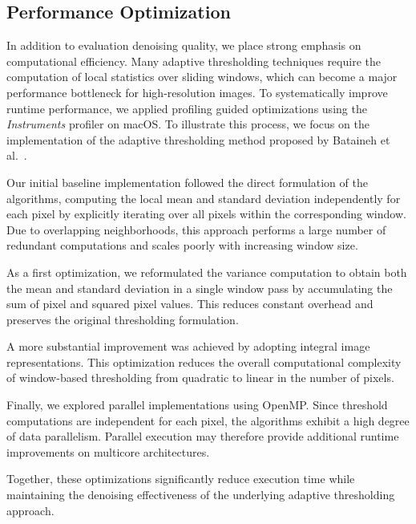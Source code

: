 \subsection{Performance Optimization}\label{subsec:optimizations}

In addition to evaluation denoising quality, we place strong emphasis on computational efficiency.
Many adaptive thresholding techniques require the computation of local statistics over sliding windows, which can become a major performance bottleneck for high-resolution images.
To systematically improve runtime performance, we applied profiling guided optimizations using the \textit{Instruments} profiler on macOS.
To illustrate this process, we focus on the implementation of the adaptive thresholding method proposed by Bataineh et al.~\cite{Bataineh2011}.

Our initial baseline implementation followed the direct formulation of the algorithms, computing the local mean and standard deviation independently for each pixel by explicitly iterating over all pixels within the corresponding window.
Due to overlapping neighborhoods, this approach performs a large number of redundant computations and scales poorly with increasing window size.

As a first optimization, we reformulated the variance computation to obtain both the mean and standard deviation in a single window pass by accumulating the sum of pixel and squared pixel values.
This reduces constant overhead and preserves the original thresholding formulation. 

A more substantial improvement was achieved by adopting integral image representations. 
This optimization reduces the overall computational complexity of window-based thresholding from quadratic to linear in the number of pixels.

Finally, we explored parallel implementations using OpenMP.
Since threshold computations are independent for each pixel, the algorithms exhibit a high degree of data parallelism.
Parallel execution may therefore provide additional runtime improvements on multicore architectures.

Together, these optimizations significantly reduce execution time while maintaining the denoising effectiveness of the underlying adaptive thresholding approach.
